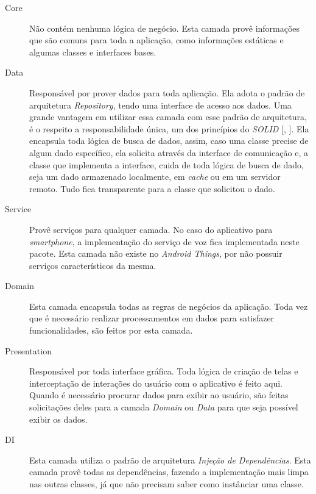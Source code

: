 \documentclass[
	12pt,				%
	oneside,			%
	a4paper,			%
	brazil				%
]{abntex2}
\newcommand{\citecustom}[1]{[\citeauthoronline{#1}, \citeyear{#1}]}
\begin{document}
\begin{description}

\item[Core] Não contém nenhuma lógica de negócio. Esta camada provê informações que são comuns para toda a aplicação, como informações estáticas e algumas classes e interfaces bases.

\item[Data] Responsável por prover dados para toda aplicação. Ela adota o padrão de arquitetura \textit{Repository}, tendo uma interface de acesso aos dados. Uma grande vantagem em utilizar essa camada com esse padrão de arquitetura, é o respeito a responsabilidade única, um dos princípios do \textit{SOLID} \citecustom{solid}. Ela encapsula toda lógica de busca de dados, assim, caso uma classe precise de algum dado específico, ela solicita através da interface de comunicação e, a classe que implementa a interface, cuida de toda lógica de busca de dado, seja um dado armazenado localmente, em \textit{cache} ou em um servidor remoto. Tudo fica transparente para a classe que solicitou o dado.

\item[Service] Provê serviços para qualquer camada. No caso do aplicativo para \textit{smartphone}, a implementação do serviço de voz fica implementada neste pacote. Esta camada não existe no \textit{Android Things}, por não possuir serviços característicos da mesma. 

\item[Domain] Esta camada encapsula todas as regras de negócios da aplicação. Toda vez que é necessário realizar processamentos em dados para satisfazer funcionalidades, são feitos por esta camada.

\item[Presentation] Responsável por toda interface gráfica. Toda lógica de criação de telas e interceptação de interações do usuário com o aplicativo é feito aqui. Quando é necessário procurar dados para exibir ao usuário, são feitas solicitações deles para a camada \textit{Domain} ou \textit{Data} para que seja possível exibir os dados.

\item[DI] Esta camada utiliza o padrão de arquitetura \textit{Injeção de Dependências}. Esta camada provê todas as dependências, fazendo a implementação mais limpa nas outras classes, já que não precisam saber como instânciar uma classe.
 
\end{description}
\end{document}
